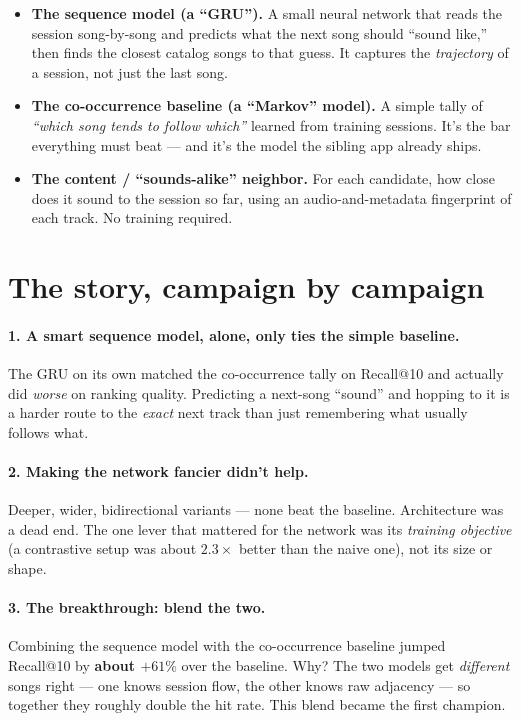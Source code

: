 \documentclass[11pt]{article}
\begin{document}
\begin{itemize}
  \item \textbf{The sequence model (a ``GRU'').} A small neural network that
  reads the session song-by-song and predicts what the next song should
  ``sound like,'' then finds the closest catalog songs to that guess. It captures
  the \emph{trajectory} of a session, not just the last song.
  \item \textbf{The co-occurrence baseline (a ``Markov'' model).} A simple tally
  of \emph{``which song tends to follow which''} learned from training sessions.
  It's the bar everything must beat --- and it's the model the sibling app already
  ships.
  \item \textbf{The content / ``sounds-alike'' neighbor.} For each candidate, how
  close does it sound to the session so far, using an audio-and-metadata
  fingerprint of each track. No training required.
\end{itemize}

\section*{The story, campaign by campaign}

\paragraph{1. A smart sequence model, alone, only ties the simple baseline.}
The GRU on its own matched the co-occurrence tally on Recall@10 and actually did
\emph{worse} on ranking quality. Predicting a next-song ``sound'' and hopping to
it is a harder route to the \emph{exact} next track than just remembering what
usually follows what.

\paragraph{2. Making the network fancier didn't help.}
Deeper, wider, bidirectional variants --- none beat the baseline. Architecture
was a dead end. The one lever that mattered for the network was its \emph{training
objective} (a contrastive setup was about $2.3\times$ better than the naive one),
not its size or shape.

\paragraph{3. The breakthrough: blend the two.}
Combining the sequence model with the co-occurrence baseline jumped Recall@10 by
\textbf{about $+61\%$} over the baseline. Why? The two models get \emph{different}
songs right --- one knows session flow, the other knows raw adjacency --- so
together they roughly double the hit rate. This blend became the first champion.
\end{document}
